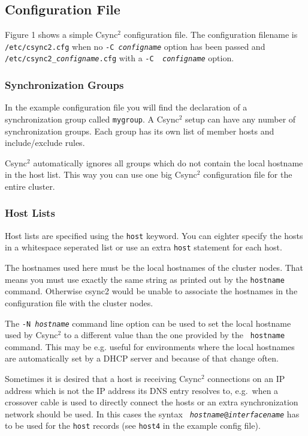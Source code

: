 \documentclass[a4paper,twocolumn]{article}
\def\csync2{{\sc Csync$^{2}$}}
\begin{document}

\subsection{Configuration File}

Figure 1 shows a simple \csync2 configuration file. The configuration filename
is {\tt /etc/csync2.cfg} when no {\tt -C {\it configname}} option has been
passed and {\tt /etc/csync2\_{\it configname}.cfg} with a {\tt -C {\it
configname}} option.

\subsubsection{Synchronization Groups}

In the example configuration file you will find the declaration of a
synchronization group called {\tt mygroup}. A \csync2 setup can have any number
of synchronization groups. Each group has its own list of member hosts and
include/exclude rules.

\csync2 automatically ignores all groups which do not contain the local
hostname in the host list. This way you can use one big \csync2 configuration
file for the entire cluster.

\subsubsection{Host Lists}

Host lists are specified using the {\tt host} keyword. You can eighter specify
the hosts in a whitespace seperated list or use an extra {\tt host} statement
for each host.

The hostnames used here must be the local hostnames of the cluster nodes. That
means you must use exactly the same string as printed out by the {\tt hostname}
command. Otherwise csync2 would be unable to associate the hostnames in the
configuration file with the cluster nodes.

The {\tt -N \it hostname} command line option can be used to set the local
hostname used by \csync2 to a different value than the one provided by the {\tt
hostname} command. This may be e.g. useful for environments where the local
hostnames are automatically set by a DHCP server and because of that change
often.

Sometimes it is desired that a host is receiving \csync2 connections on an IP
address which is not the IP address its DNS entry resolves to, e.g.~when a
crossover cable is used to directly connect the hosts or an extra
synchronization network should be used. In this cases the syntax {\tt{\it
hostname}@{\it interfacename}} has to be used for the {\tt host} records (see
{\tt host4} in the example config file).
\end{document}
